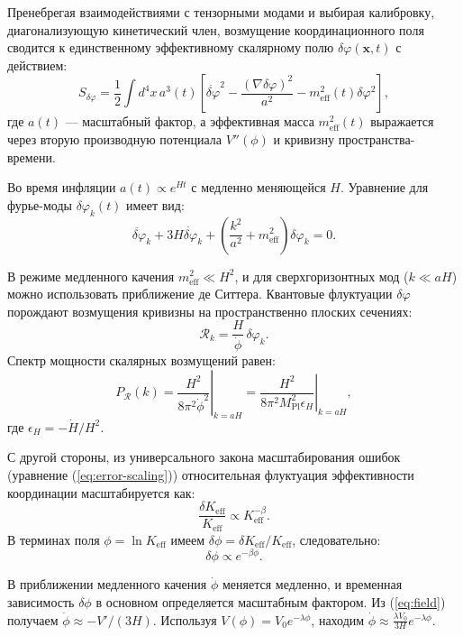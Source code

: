 \documentclass[11pt,a4paper]{article}
\newcommand{\Keff}{K_{\mathrm{eff}}}
\newcommand{\Mpl}{M_{\mathrm{Pl}}}
\begin{document}
	Пренебрегая взаимодействиями с тензорными модами и выбирая калибровку, диагонализующую кинетический член, возмущение координационного поля сводится к единственному эффективному скалярному полю \(\delta\varphi(\mathbf{x},t)\) с действием:
	\begin{equation}
		S_{\delta\varphi} = \frac{1}{2} \int d^4x \, a^3(t) \left[ \dot{\delta\varphi}^2 - \frac{(\nabla\delta\varphi)^2}{a^2} - m_{\mathrm{eff}}^2(t) \delta\varphi^2 \right],
	\end{equation}
	где \(a(t)\) — масштабный фактор, а эффективная масса \(m_{\mathrm{eff}}^2(t)\) выражается через вторую производную потенциала \(V''(\phi)\) и кривизну пространства-времени.
	
	Во время инфляции \(a(t) \propto e^{Ht}\) с медленно меняющейся \(H\). Уравнение для фурье-моды \(\delta\varphi_k(t)\) имеет вид:
	\begin{equation}
		\ddot{\delta\varphi}_k + 3H\dot{\delta\varphi}_k + \left( \frac{k^2}{a^2} + m_{\mathrm{eff}}^2 \right) \delta\varphi_k = 0.
	\end{equation}
	
	В режиме медленного качения \(m_{\mathrm{eff}}^2 \ll H^2\), и для сверхгоризонтных мод (\(k \ll aH\)) можно использовать приближение де Ситтера. Квантовые флуктуации \(\delta\varphi\) порождают возмущения кривизны на пространственно плоских сечениях:
	\begin{equation}
		\mathcal{R}_k = \frac{H}{\dot{\phi}} \, \delta\varphi_k.
	\end{equation}
	Спектр мощности скалярных возмущений равен:
	\begin{equation}
		P_{\mathcal{R}}(k) = \left. \frac{H^2}{8\pi^2 \dot{\phi}^2} \right|_{k=aH} = \left. \frac{H^2}{8\pi^2 \Mpl^2 \epsilon_H} \right|_{k=aH},
	\end{equation}
	где \(\epsilon_H = -\dot{H}/H^2\).
	
	С другой стороны, из универсального закона масштабирования ошибок (уравнение (\ref{eq:error-scaling})) относительная флуктуация эффективности координации масштабируется как:
	\begin{equation}
		\frac{\delta\Keff}{\Keff} \propto \Keff^{-\beta}.
	\end{equation}
	В терминах поля \(\phi = \ln\Keff\) имеем \(\delta\phi = \delta\Keff/\Keff\), следовательно:
	\begin{equation}
		\delta\phi \propto e^{-\beta\phi}.
	\end{equation}
	
	В приближении медленного качения \(\dot{\phi}\) меняется медленно, и временная зависимость \(\delta\phi\) в основном определяется масштабным фактором. Из (\ref{eq:field}) получаем \(\dot{\phi} \approx -V'/(3H)\). Используя \(V(\phi) = V_0 e^{-\lambda\phi}\), находим \(\dot{\phi} \approx \frac{\lambda V_0}{3H} e^{-\lambda\phi}\).
	
\end{document}
